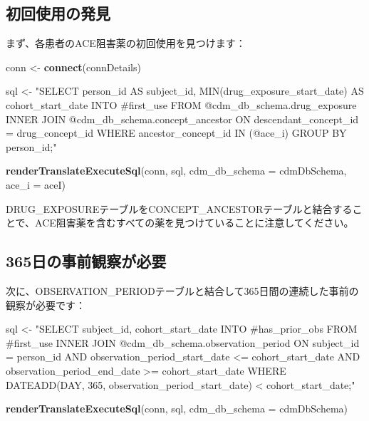 \documentclass[
  11pt]{book}
\newenvironment{Shaded}{\begin{snugshade}}{\end{snugshade}}
\newcommand{\AttributeTok}[1]{\textcolor[rgb]{0.13,0.29,0.53}{#1}}
\newcommand{\FunctionTok}[1]{\textcolor[rgb]{0.13,0.29,0.53}{\textbf{#1}}}
\newcommand{\NormalTok}[1]{#1}
\newcommand{\OtherTok}[1]{\textcolor[rgb]{0.56,0.35,0.01}{#1}}
\newcommand{\StringTok}[1]{\textcolor[rgb]{0.31,0.60,0.02}{#1}}
\theoremstyle{definition}
\theoremstyle{definition}
\theoremstyle{definition}
\theoremstyle{definition}
\theoremstyle{remark}
\begin{document}
\subsection{初回使用の発見}\label{ux521dux56deux4f7fux7528ux306eux767aux898b}

まず、各患者のACE阻害薬の初回使用を見つけます：

\begin{Shaded}
\begin{Highlighting}[]
\NormalTok{conn }\OtherTok{\textless{}{-}} \FunctionTok{connect}\NormalTok{(connDetails)}

\NormalTok{sql }\OtherTok{\textless{}{-}} \StringTok{"SELECT person\_id AS subject\_id,}
\StringTok{  MIN(drug\_exposure\_start\_date) AS cohort\_start\_date}
\StringTok{INTO \#first\_use}
\StringTok{FROM @cdm\_db\_schema.drug\_exposure}
\StringTok{INNER JOIN @cdm\_db\_schema.concept\_ancestor}
\StringTok{  ON descendant\_concept\_id = drug\_concept\_id}
\StringTok{WHERE ancestor\_concept\_id IN (@ace\_i)}
\StringTok{GROUP BY person\_id;"}

\FunctionTok{renderTranslateExecuteSql}\NormalTok{(conn,}
\NormalTok{                          sql,}
                          \AttributeTok{cdm\_db\_schema =}\NormalTok{ cdmDbSchema,}
                          \AttributeTok{ace\_i =}\NormalTok{ aceI)}
\end{Highlighting}
\end{Shaded}

DRUG\_EXPOSUREテーブルをCONCEPT\_ANCESTORテーブルと結合することで、ACE阻害薬を含むすべての薬を見つけていることに注意してください。

\subsection{365日の事前観察が必要}\label{ux65e5ux306eux4e8bux524dux89b3ux5bdfux304cux5fc5ux8981}

次に、OBSERVATION\_PERIODテーブルと結合して365日間の連続した事前の観察が必要です：

\begin{Shaded}
\begin{Highlighting}[]
\NormalTok{sql }\OtherTok{\textless{}{-}} \StringTok{"SELECT subject\_id,}
\StringTok{  cohort\_start\_date}
\StringTok{INTO \#has\_prior\_obs}
\StringTok{FROM \#first\_use}
\StringTok{INNER JOIN @cdm\_db\_schema.observation\_period}
\StringTok{  ON subject\_id = person\_id}
\StringTok{    AND observation\_period\_start\_date \textless{}= cohort\_start\_date}
\StringTok{    AND observation\_period\_end\_date \textgreater{}= cohort\_start\_date}
\StringTok{WHERE DATEADD(DAY, 365, observation\_period\_start\_date) \textless{} cohort\_start\_date;"}

\FunctionTok{renderTranslateExecuteSql}\NormalTok{(conn, sql, }\AttributeTok{cdm\_db\_schema =}\NormalTok{ cdmDbSchema)}
\end{Highlighting}
\end{Shaded}
\end{document}
